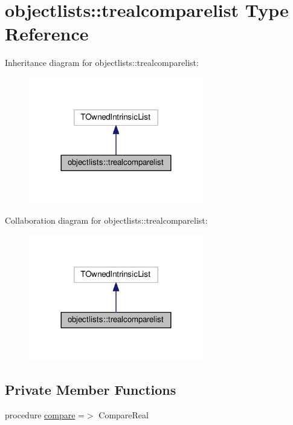\hypertarget{structobjectlists_1_1trealcomparelist}{}\section{objectlists\+:\+:trealcomparelist Type Reference}
\label{structobjectlists_1_1trealcomparelist}


Inheritance diagram for objectlists\+:\+:trealcomparelist\+:
\nopagebreak
\begin{figure}[H]
\begin{center}
\leavevmode
\includegraphics[width=216pt]{structobjectlists_1_1trealcomparelist__inherit__graph}
\end{center}
\end{figure}


Collaboration diagram for objectlists\+:\+:trealcomparelist\+:
\nopagebreak
\begin{figure}[H]
\begin{center}
\leavevmode
\includegraphics[width=216pt]{structobjectlists_1_1trealcomparelist__coll__graph}
\end{center}
\end{figure}
\subsection*{Private Member Functions}
\begin{DoxyCompactItemize}
\item 
procedure \mbox{\hyperlink{structobjectlists_1_1trealcomparelist_aabec69c557b4a6cfddee7575044bce97}{compare}} =$>$ Compare\+Real
\end{DoxyCompactItemize}



